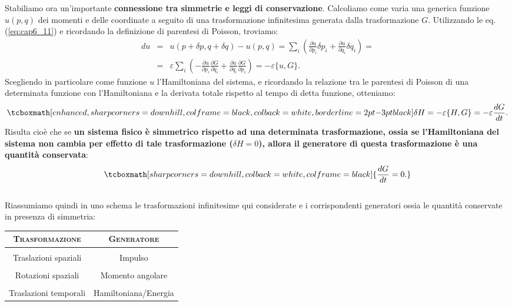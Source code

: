 Stabiliamo ora un'importante \textbf{connessione tra simmetrie e leggi di conservazione}. Calcoliamo come varia una generica funzione $u(p,q)$ dei momenti e delle coordinate a seguito di una trasformazione infinitesima generata dalla trasformazione $G$. Utilizzando le eq. (\ref{eq:cap6_11}) e ricordando la definizione di parentesi di Poisson, troviamo:
	\begin{eqnarray}
		du & = & u(p+\delta p , q+\delta q )- u (p,q) = \sum _i \left( \frac{\partial u}{\partial p_i} \delta p_i + \frac{\partial u}{\partial q_i } \delta q_i \right) = \nonumber \\
		&=& \varepsilon \sum _i \left( -\frac{\partial u}{\partial p_i} \frac{\partial G}{\partial q_i} + \frac{\partial u}{\partial q_i } \frac{\partial G}{\partial p_i} \right) =-\varepsilon \{ u, G \} .
	\end{eqnarray}
Scegliendo in particolare come funzione $u$ l'Hamiltoniana del sistema,  e ricordando la relazione tra le parentesi di Poisson di una determinata funzione con l'Hamiltoniana e la derivata totale rispetto al tempo di detta funzione, otteniamo:
	\begin{equation}
		\tcboxmath[enhanced, sharp corners=downhill, colframe=black, colback=white, borderline={2pt}{-3pt}{black}]{
			\delta H = -\varepsilon \{H,G\} = -\varepsilon \frac{dG}{dt}.
			}
	\end{equation}
Risulta cioè che se \textbf{un sistema fisico è simmetrico rispetto ad una determinata trasformazione, ossia se l'Hamiltoniana del sistema non cambia per effetto di tale trasformazione ($\delta H =0$), allora il generatore di questa trasformazione è una quantità conservata}:
	\begin{equation}
		\tcboxmath[sharp corners=downhill, colback=white, colframe=black]{
			\frac{dG}{dt}=0.
			}
	\end{equation}\\
	
Riassumiamo quindi in uno schema le trasformazioni infinitesime qui considerate e i corrispondenti generatori ossia le quantità conservate in presenza di simmetria:

\begin{table}[!htbp]
\begin{center}
\begin{tabular}{c|c}
\textbf{\textsc{Trasformazione}} & \textbf{\textsc{Generatore}}\\
\hline \\
Traslazioni spaziali & Impulso \\
\hline \\
Rotazioni spaziali & Momento angolare \\
\hline \\
Traslazioni temporali &  Hamiltoniana/Energia \\
\hline 
\end{tabular}
\end{center}
\end{table}
